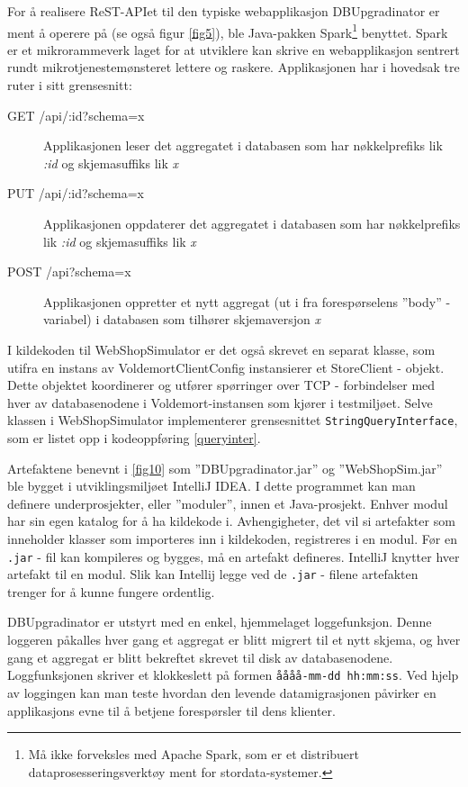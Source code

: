 For å realisere ReST-APIet til den typiske webapplikasjon DBUpgradinator er ment å operere på (se også figur \ref{fig5}), ble Java-pakken Spark\footnote{Må ikke forveksles med Apache Spark, som er et distribuert dataprosesseringsverktøy ment for stordata-systemer.} benyttet. Spark er et mikro\-rammeverk laget for at utviklere kan skrive en webapplikasjon sentrert rundt mikrotjeneste\-mønsteret lettere og raskere. Applikasjonen har i hovedsak tre ruter i sitt grensesnitt:

\begin{description}
  \item[GET /api/:id?schema=x] Applikasjonen leser det aggregatet i databasen som har nøkkelprefiks lik \emph{:id} og skjemasuffiks lik \emph{x}
  \item[PUT /api/:id?schema=x] Applikasjonen oppdaterer det aggregatet i databasen som har nøkkelprefiks lik \emph{:id} og skjemasuffiks lik \emph{x}
  \item[POST /api?schema=x] Applikasjonen oppretter et nytt aggregat (ut i fra forespørselens ''body'' - variabel) i databasen som tilhører skjemaversjon \emph{x}
\end{description}

I kildekoden til WebShopSimulator er det også skrevet en separat klasse, som utifra en instans av VoldemortClientConfig instansierer et StoreClient - objekt. Dette objektet koordinerer og utfører spørringer over TCP - forbindelser med hver av databasenodene i Voldemort-instansen som kjører i testmiljøet. Selve klassen i WebShopSimulator implementerer grensesnittet \texttt{StringQueryInterface}, som er listet opp i kodeoppføring \ref{queryinter}.

Artefaktene benevnt i \ref{fig10} som ''DBUpgradinator.jar'' og ''WebShopSim.jar'' ble bygget i utviklingsmiljøet IntelliJ IDEA. I dette programmet kan man definere underprosjekter, eller ''moduler'', innen et Java-prosjekt. Enhver modul har sin egen katalog for å ha kildekode i. Avhengigheter, det vil si artefakter som inneholder klasser som importeres inn i kildekoden, registreres i en modul. Før en \texttt{.jar} - fil kan kompileres og bygges, må en artefakt defineres. IntelliJ knytter hver artefakt til en modul. Slik kan Intellij legge ved de \texttt{.jar} - filene artefakten trenger for å kunne fungere ordentlig.

DBUpgradinator er utstyrt med en enkel, hjemmelaget loggefunksjon. Denne loggeren påkalles hver gang et aggregat er blitt migrert til et nytt skjema, og hver gang et aggregat er blitt bekreftet skrevet til disk av databasenodene. Loggfunksjonen skriver et klokkeslett på formen \texttt{åååå-mm-dd hh:mm:ss}. Ved hjelp av loggingen kan man teste hvordan den levende datamigrasjonen påvirker en applikasjons evne til å betjene forespørsler til dens klienter.

